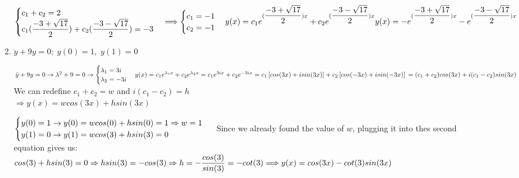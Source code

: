 \documentclass[fleqn]{article}
\begin{document}
\begin{enumerate}
\begin{enumerate}
        \textcolor{hwColor}{
          $
            \begin{cases}
              c_1+c_2=2 \\
              c_1(\dfrac{-3+\sqrt{17}}{2})+c_2(\dfrac{-3-\sqrt{17}}{2})=-3
            \end{cases} \Longrightarrow \begin{cases}
              c_1=-1 \\
              c_2=-1
            \end{cases}\\
            \\
            y(x)=c_1e^{(\dfrac{-3+\sqrt{17}}{2}) x}+c_2e^{(\dfrac{-3-\sqrt{17}}{2}) x} \\
            y(x)=-e^{(\dfrac{-3+\sqrt{17}}{2}) x}-e^{(\dfrac{-3-\sqrt{17}}{2}) x}
          $   
        }
        
      \item $\ddot{y}+9y=0;\;y\left( 0\right) =1,\;y\left( 1\right)=0$

        \textcolor{hwColor}{
          $
            \ddot{y}+9y=0 \rightarrow \lambda^2+9=0 \rightarrow \begin{cases}
              \lambda_1=3i \\
              \lambda_2=-3i
            \end{cases} \\
            \\
            y(x)=c_1e^{\lambda_1 x}+c_2e^{\lambda_2 x}=c_1e^{3i x}+c_2e^{-3i x} \\
            =c_1\left[cos(3x)+isin(3x)\right]+c_2\left[cos(-3x)+isin(-3x)\right] \\
            =(c_1+c_2)cos(3x)+i(c_1-c_2)sin(3x)
            \\
          $
          We can redefine $c_1+c_2=w$ and $i(c_1-c_2)=h$  \\
          $
            \Rightarrow y(x)=wcos(3x)+hsin(3x)
          $
        }

        \textcolor{hwColor}{
          $
            \begin{cases}
              y(0)=1 \rightarrow y(0)=wcos(0)+hsin(0)=1 \Rightarrow w=1 \\
              y(1)=0 \rightarrow y(1)=wcos(3)+hsin(3)=0
            \end{cases} \\
          $
          Since we already found the value of $w$, plugging it into thes second equation gives us: \\
          $
          cos(3)+hsin(3)=0 \Rightarrow hsin(3)=-cos(3) \\
          \Rightarrow h=-\dfrac{cos(3)}{sin(3)}=-cot(3) \\
          \\
          \Longrightarrow y(x)=cos(3x)-cot(3)sin(3x)
          $
        }
      

\end{enumerate}
\end{enumerate}
\end{document}
